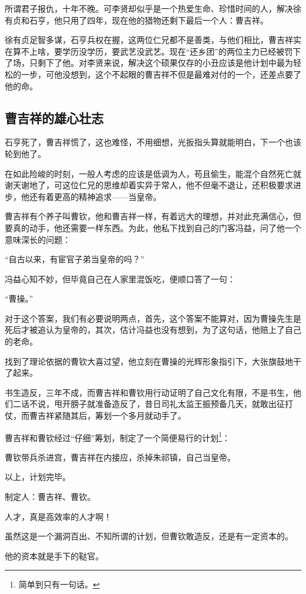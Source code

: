 \begin{multicols}{\theparacolNo}
所谓君子报仇，十年不晚。可李贤却似乎是一个热爱生命、珍惜时间的人，解决徐有贞和石亨，他只用了四年，现在他的猎物还剩下最后一个人：曹吉祥。

徐有贞足智多谋，石亨兵权在握，这两位仁兄都不是善类，与他们相比，曹吉祥实在算不上啥，要学历没学历，要武艺没武艺。现在“还乡团”的两位主力已经被罚下了场，只剩下了他。对李贤来说，解决这个硕果仅存的小丑应该是他计划中最为轻松的一步，可他没想到，这个不起眼的曹吉祥不但是最难对付的一个，还差点要了他的命。

\subsection{曹吉祥的雄心壮志}
石亨死了，曹吉祥慌了，这也难怪，不用细想，光扳指头算就能明白，下一个也该轮到他了。

在如此险峻的时刻，一般人考虑的应该是低调为人，苟且偷生，能混个自然死亡就谢天谢地了，可这位仁兄的思维却着实异于常人，他不但毫不退让，还积极要求进步，他还有着更高的精神追求——当皇帝。

曹吉祥有个养子叫曹钦，他和曹吉祥一样，有着远大的理想，并对此充满信心，但要真的动手，他还需要一样东西。为此，他私下找到自己的门客冯益，问了他一个意味深长的问题：

“自古以来，有宦官子弟当皇帝的吗？”

冯益心知不妙，但毕竟自己在人家里混饭吃，便顺口答了一句：

“曹操。”

对于这个答案，我们有必要说明两点，首先，这个答案不能算对，因为曹操先生是死后才被追认为皇帝的，其次，估计冯益也没有想到，为了这句话，他赔上了自己的老命。

找到了理论依据的曹钦大喜过望，他立刻在曹操的光辉形象指引下，大张旗鼓地干了起来。

书生造反，三年不成，而曹吉祥和曹钦用行动证明了自己文化有限，不是书生，他们二话不说，甩开膀子就准备造反了，昔日司礼太监王振预备几天，就敢出征打仗，而曹吉祥紧随其后，筹划一个多月就动手了。

曹吉祥和曹钦经过“仔细”筹划，制定了一个简便易行的计划\footnote{简单到只有一句话。}：

曹钦带兵杀进宫，曹吉祥在内接应，杀掉朱祁镇，自己当皇帝。

以上，计划完毕。

制定人：曹吉祥、曹钦。

人才，真是高效率的人才啊！

虽然这是一个漏洞百出、不知所谓的计划，但曹钦敢造反，还是有一定资本的。

他的资本就是手下的鞑官。


\end{multicols}
